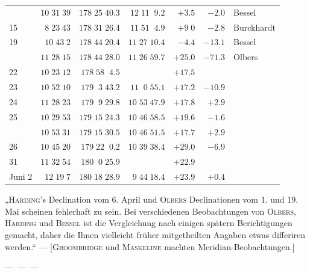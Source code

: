 \begin{longtable}{l|r|r|r|r|r|l}
 & $10\;31\;39$ & $178\;25\;40.3$ & $12\;11\;\;9.2$ & $+3.5$ & $-2.0$ & Bessel \\
15 & $8\;23\;43$ & $178\;31\;26.4$ & $11\;51\;\;4.9$ & $+9\;0$ & $-2.8$ & Burckhardt \\
19 & $10\;43\;2$ & $178\;44\;20.4$ & $11\;27\;10.4$ & $-4.4$ & $-13.1$ & Bessel \\
 & $11\;28\;15$ & $178\;44\;28.0$ & $11\;26\;59.7$ & $+25.0$ & $-71.3$ & Olbers \\
22 & $10\;23\;12$ & $178\;58\;\;4.5$ &  & $+17.5$ &  &  \\
23 & $10\;52\;10$ & $179\;\;3\;43.2$ & $11\;\;0\;55.1$ & $+17.2$ & $-10.9$ &  \\
24 & $11\;28\;23$ & $179\;\;9\;29.8$ & $10\;53\;47.9$ & $+17.8$ & $+2.9$ &  \\
25 & $10\;29\;53$ & $179\;15\;24.3$ & $10\;46\;58.5$ & $+19.6$ & $-1.6$ &  \\
 & $10\;53\;31$ & $179\;15\;30.5$ & $10\;46\;51.5$ & $+17.7$ & $+2.9$ &  \\
26 & $10\;45\;20$ & $179\;22\;\;0.2$ & $10\;39\;38.4$ & $+29.0$ & $-6.9$ &  \\
31 & $11\;32\;54$ & $180\;\;0\;25.9$ &  & $+22.9$ &  &  \\
Juni 2 & $12\;19\;7$ & $180\;18\;28.9$ & $9\;44\;18.4$ & $+23.9$ & $+0.4$ &  \\
\end{longtable}
\endgroup
\smallskip
\par\indent „\textsc{Harding}'s Declination vom 6. April und \textsc{Olbers} Declinationen vom 1. und 19. Mai
scheinen fehlerhaft zu sein. Bei verschiedenen Beobachtungen von \textsc{Olbers}, \textsc{Harding} und
\textsc{Bessel} ist die Vergleichung nach einigen spätern Berichtigungen gemacht, daher die Ihnen vielleicht
früher mitgetheilten Angaben etwas differiren werden.“ — [\textsc{Groombridge} und \textsc{Maskeline}
machten Meridian-Beobachtungen.]

\smallskip
\par\indent ---\ ---\ ---\par

\begin{flushright}
\end{flushright}
